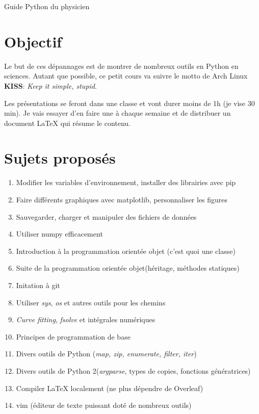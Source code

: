 \documentclass{article}
\begin{document}
\begin{center}
\LARGE Guide Python du physicien
\end{center}

\section*{Objectif}
Le but de ces dépannages est de montrer de nombreux outils en Python en sciences. Autant que possible, ce petit cours va suivre le motto de Arch Linux \textbf{KISS}: \textit{Keep it simple, stupid}. 

Les présentations se feront dans une classe et vont durer moins de 1h (je vise 30 min). Je vais essayer d'en faire une à chaque semaine et de distribuer un document \LaTeX{} qui résume le contenu.

\section*{Sujets proposés}

\begin{enumerate}
    \item Modifier les variables d'environnement, installer des librairies avec pip 
    \item Faire différents graphiques avec matplotlib, personnaliser les figures
    \item Sauvegarder, charger et manipuler des fichiers de données 
    \item Utiliser numpy efficacement
    \item Introduction à la programmation orientée objet (c'est quoi une classe)
    \item Suite de la programmation orientée objet(héritage, méthodes statiques)
    \item Initation à git
    \item Utiliser \textit{sys}, \textit{os} et autres outils pour les chemins
    \item \textit{Curve fitting}, \textit{fsolve} et intégrales numériques
    \item Principes de programmation de base
    \item Divers outils de Python (\textit{map, zip, enumerate, filter, iter})
    \item Divers outils de Python 2(\textit{argparse}, types de copies, fonctions génératrices)
    \item Compiler \LaTeX{} localement (ne plus dépendre de Overleaf)
    \item vim (éditeur de texte puissant doté de nombreux outils)
\end{enumerate}
\end{document}
